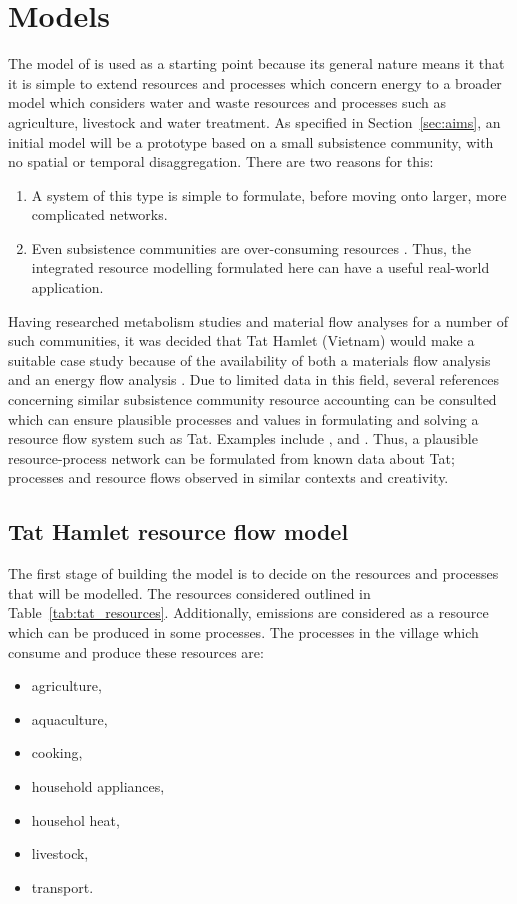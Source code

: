 \section{Models} \label{sec:models}
The model of \citet{Samsatli} is used as a starting point because its general nature means it that it is simple to extend resources and processes which concern energy to a broader model which considers water and waste resources and processes such as agriculture, livestock and water treatment. As specified in Section~\ref{sec:aims}, an initial model will be a prototype based on a small subsistence community, with no spatial or temporal disaggregation. There are two reasons for this: 
\begin{enumerate}
	\item A system of this type is simple to formulate, before moving onto larger, more complicated networks.
	\item Even subsistence communities are over-consuming resources \citep{Hobbes2005, Hobbes2007, Shandl2006, Haberl2002}. Thus, the integrated resource modelling formulated here can have a useful real-world application.
\end{enumerate}

Having researched metabolism studies and material flow analyses for a number of such communities, it was decided that Tat Hamlet (Vietnam) would make a suitable case study because of the availability of both a materials flow analysis \citep{Hobbes2007, Shandl2006} and an energy flow analysis \citep{Heezen2003}. Due to limited data in this field, several references concerning similar subsistence community resource accounting can be consulted which can ensure plausible processes and values in formulating and solving a resource flow system such as Tat. Examples include \citet{Alam1997}, \citet{Alam1999} and \citep{Tripathi2001}. Thus, a plausible resource-process network can be formulated from known data about Tat; processes and resource flows observed in similar contexts and creativity.

\subsection{Tat Hamlet resource flow model}
The first stage of building the model is to decide on the resources and processes that will be modelled. The resources considered outlined in Table~\ref{tab:tat_resources}. Additionally, emissions are considered as a resource which can be produced in some processes. The processes in the village which consume and produce these resources are:
\begin{itemize}
	\item agriculture,
	\item aquaculture,
	\item cooking,
	\item household appliances,
	\item househol heat,
	\item livestock,
	\item transport.
\end{itemize}

